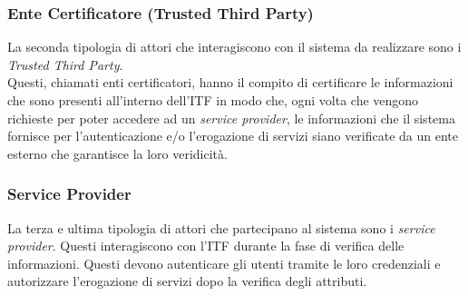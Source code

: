 \subsubsection{Ente Certificatore (Trusted Third Party)}
La seconda tipologia di attori che interagiscono con il sistema da realizzare sono i \textit{Trusted Third Party}.\\
Questi, chiamati enti certificatori, hanno il compito di certificare le informazioni che sono presenti all'interno dell'\gls{ITF} in modo che, ogni volta che vengono richieste per poter accedere ad un \textit{service provider}, le informazioni che il sistema fornisce per l'autenticazione e/o l'erogazione di servizi siano verificate da un ente esterno che garantisce la loro veridicità.
\subsubsection{Service Provider}
La terza e ultima tipologia di attori che partecipano al sistema sono i \textit{service provider}.
Questi interagiscono con l'\gls{ITF} durante la fase di verifica delle informazioni. Questi devono autenticare gli utenti tramite le loro credenziali e autorizzare l'erogazione di servizi dopo la verifica degli attributi.
